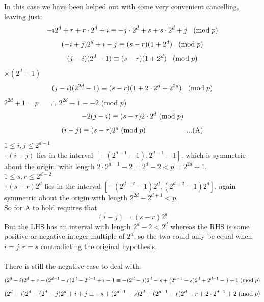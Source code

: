 \documentclass[
  12pt,
  a4paper]{book}
\begin{document}
In this case we have been helped out with some very convenient
cancelling, leaving just:
\[-i2^d+r+r \cdot 2^d + i \equiv -j \cdot 2^d + s + s \cdot 2^d + j \hspace{0.3cm} (\mathrm{mod} \hspace{0.1cm} p)\]
\[(-i+j)2^d + i -j \equiv (s-r)(1+2^d) \hspace{0.3cm} (\mathrm{mod} \hspace{0.1cm} p)\]
\[(j-i)(2^d -1) \equiv (s-r)(1+2^d) \hspace{0.3cm} (\mathrm{mod} \hspace{0.1cm} p)\]
\(\times (2^d+1)\)
\[(j-i)(2^{2d} -1) \equiv (s-r)(1+2 \cdot 2^d + 2^{2d}) \hspace{0.3cm} (\mathrm{mod} \hspace{0.1cm} p)\]
\(2^{2d}+1=p\) \(\hspace{0.5cm}\therefore\) \(2^{2d}-1 \equiv -2\) (mod
\(p\))
\[-2(j-i)\equiv (s-r)2 \cdot 2^d \hspace{0.1cm} (\mathrm{mod} \hspace{0.1cm} p)\]
\[(i-j)\equiv (s-r) 2^d \hspace{0.1cm} (\mathrm{mod} \hspace{0.1cm} p) \hspace{2cm} ...(\mathrm{A})\]
\(1 \leq i, j \leq 2^{d-1}\)\\
\(\therefore (i-j)\) lies in the interval \([-(2^{d-1}-1),2^{d-1}-1]\),
which is symmetric about the origin, with length
\(2 \cdot 2^{d-1}-2=2^d-2 < p = 2^{2d}+1\).\\
\(1 \leq s,r \leq 2^{d-2}\)\\
\(\therefore(s-r)2^d\) lies in the interval
\([-(2^{d-2}-1)2^d,(2^{d-2}-1)2^d]\), again symmetric about the origin
with length \(2^{2d}-2^{d+1} < p\).\\
So for A to hold requires that \[(i-j)=(s-r)2^d\] But the LHS has an
interval with length \(2^d-2 < 2^d\) whereas the RHS is some positive or
negative integer multiple of \(2^d\), so the two could only be equal
when \(i=j,r=s\) contradicting the original hypothesis.\\
~\\
There is still the negative case to deal with:
\[(2^d-i)2^d+r-(2^{d-1}-r)2^d-2^{d-1}+i-1 \equiv
-(2^d-j)2^d-s+(2^{d-1}-s)2^d+2^{d-1}-j+1\hspace{0.1cm} (\mathrm{mod} \hspace{0.1cm} p)\]
\[(2^d-i)2^d-(2^{d}-j)2^d+i+j \equiv
-s+(2^{d-1}-s)2^d + (2^{d-1} -r)2^d -r + 2 \cdot 2^{d-1} + 2 \hspace{0.1cm} (\mathrm{mod} \hspace{0.1cm} p)\]
\end{document}
